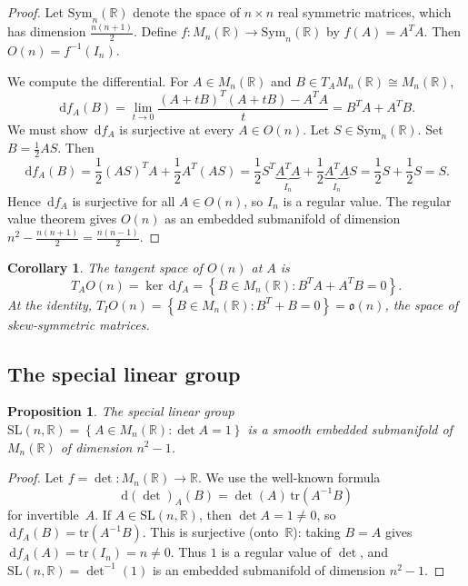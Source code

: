 \documentclass[12pt,a4paper,openany]{book}
\newtheorem{proposition}[theorem]{Proposition}
\newtheorem{corollary}[theorem]{Corollary}
\theoremstyle{definition}
\theoremstyle{remark}
\newcommand{\R}{\mathbb{R}}
\newcommand{\SL}{\mathrm{SL}}
\newcommand{\dd}{\,\mathrm{d}}
\newcommand{\set}[1]{\left\{ #1 \right\}}
\begin{document}
\begin{proof}
Let $\mathrm{Sym}_n(\R)$ denote the space of $n \times n$ real symmetric
matrices, which has dimension $\frac{n(n+1)}{2}$.  Define
$f \colon M_n(\R) \to \mathrm{Sym}_n(\R)$ by $f(A) = A^T A$.
Then $O(n) = f^{-1}(I_n)$.

We compute the differential.  For $A \in M_n(\R)$ and $B \in T_A M_n(\R)
\cong M_n(\R)$,
\[
  \dd f_A(B) = \lim_{t \to 0} \frac{(A+tB)^T(A+tB) - A^T A}{t}
  = B^T A + A^T B.
\]
We must show $\dd f_A$ is surjective at every $A \in O(n)$.
Let $S \in \mathrm{Sym}_n(\R)$.  Set $B = \frac{1}{2}AS$. Then
\[
  \dd f_A(B) = \frac{1}{2}(AS)^T A + \frac{1}{2}A^T(AS)
  = \frac{1}{2}S^T \underbrace{A^T A}_{I_n}
    + \frac{1}{2}\underbrace{A^T A}_{I_n} S
  = \frac{1}{2}S + \frac{1}{2}S = S.
\]
Hence $\dd f_A$ is surjective for all $A \in O(n)$, so $I_n$ is a
regular value.  The regular value theorem gives $O(n)$ as an
embedded submanifold of dimension
$n^2 - \frac{n(n+1)}{2} = \frac{n(n-1)}{2}$.
\end{proof}

\begin{corollary}\label{cor:tangent-On}%
The tangent space of $O(n)$ at $A$ is
\[
  T_A O(n) = \ker \dd f_A
  = \set{B \in M_n(\R) : B^T A + A^T B = 0}.
\]
At the identity, $T_I O(n) = \set{B \in M_n(\R) : B^T + B = 0}
= \mathfrak{o}(n)$, the space of skew-symmetric
matrices.
\end{corollary}

\subsection{The special linear group}\label{ssec:SLn}

\begin{proposition}\label{prop:SLn-submanifold}%
\index{$\SL(n, \R)$}
The special linear group $\SL(n, \R) = \set{A \in M_n(\R) : \det A = 1}$
is a smooth embedded submanifold of $M_n(\R)$ of dimension $n^2 - 1$.
\end{proposition}

\begin{proof}
Let $f = \det \colon M_n(\R) \to \R$.  We use the well-known formula
\[
  \dd(\det)_A(B) = \det(A)\, \mathrm{tr}(A^{-1}B)
\]
for invertible~$A$.  If $A \in \SL(n, \R)$, then $\det A = 1 \neq 0$,
so $\dd f_A(B) = \mathrm{tr}(A^{-1}B)$.  This is surjective
(onto~$\R$): taking $B = A$ gives
$\dd f_A(A) = \mathrm{tr}(I_n) = n \neq 0$.
Thus $1$ is a regular value of $\det$, and
$\SL(n, \R) = \det^{-1}(1)$ is an embedded submanifold of dimension
$n^2 - 1$.
\end{proof}
\end{document}
